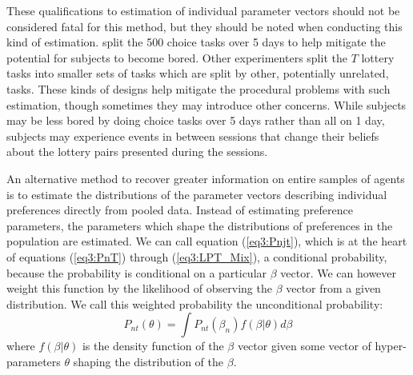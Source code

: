 \documentclass[../main.tex]{subfiles}
\begin{document}
These qualifications to estimation of individual parameter vectors should not be considered fatal for this method, but they should be noted when conducting this kind of estimation.
\textcite{Hey2001} split the 500 choice tasks over 5 days to help mitigate the potential for subjects to become bored.
Other experimenters split the $T$ lottery tasks into smaller sets of tasks which are split by other, potentially unrelated, tasks.
These kinds of designs help mitigate the procedural problems with such estimation, though sometimes they may introduce other concerns.
While subjects may be less bored by doing choice tasks over 5 days rather than all on 1 day, subjects may experience events in between sessions that change their beliefs about the lottery pairs presented during the sessions.

An alternative method to recover greater information on entire samples of agents is to estimate the distributions of the parameter vectors describing individual preferences directly from pooled data.{\footnotemark}
Instead of estimating preference parameters, the parameters which shape the distributions of preferences in the population are estimated.
We can call equation (\ref{eq3:Pnjt}), which is at the heart of equations (\ref{eq3:PnT}) through (\ref{eq3:LPT_Mix}), a conditional probability, because the probability is conditional on a particular $\beta$ vector.
We can however weight this function by the likelihood of observing the $\beta$ vector from a given distribution.{\footnotemark}
We call this weighted probability the unconditional probability:
\begin{equation}
	\label{eq3:Pnt}
	P_{nt}(\theta) = \int P_{nt}(\beta_n) f(\beta | \theta) d\beta	
\end{equation}
\noindent where $f(\beta|\theta)$ is the density function of the $\beta$ vector given some vector of hyper-parameters $\theta$ shaping the distribution of the $\beta$.

\addtocounter{footnote}{-2}
\end{document}
